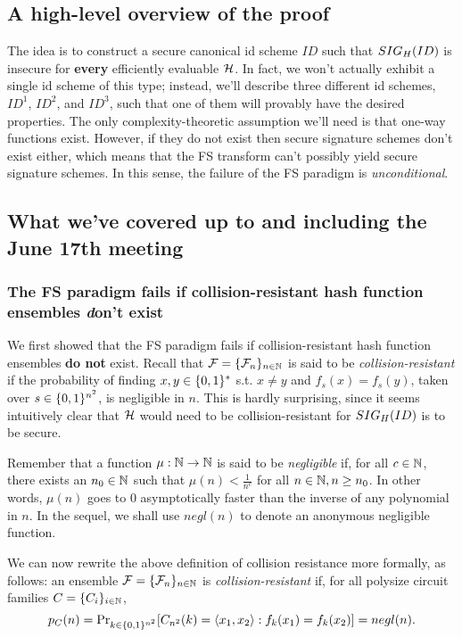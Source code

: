 \documentclass[12pt,twoside]{article}
\begin{document}
\subsection{A high-level overview of the proof}
The idea is to construct a secure canonical id scheme $ID$ such that
$\fs{ID}{H}$ is insecure for {\bf every} efficiently evaluable 
$\fanh$. In fact, we won't actually exhibit a single id scheme of this type; 
instead, we'll describe three different id schemes, $ID^1$, $ID^2$, and 
$ID^3$, such that one of them will provably have the desired properties.
The only complexity-theoretic assumption we'll need is that one-way functions 
exist. However, if they do not exist then secure signature schemes don't exist 
either, which means that the FS transform can't possibly yield secure 
signature schemes. In this sense, the failure of the FS paradigm is 
{\it unconditional}.

\subsection{What we've covered up to and including the June 17th
meeting}
\subsubsection{The FS paradigm fails if collision-resistant hash function 
ensembles {\emph don't} exist}
We first showed that the FS paradigm fails if collision-resistant hash 
function ensembles {\bf do not} exist. Recall that $\fanf = \ens{\fanf}{n}$ is 
said to be {\it collision-resistant} 
if the probability of finding $x,y \in \strs{*}$ s.t. $x \neq y$ and 
$f_s(x) = f_s(y)$, taken over $s \in \strs{n^2}$, is negligible in $n$.
This is hardly surprising, since it seems intuitively clear that $\fanh$ would 
need to be collision-resistant for $\fs{ID}{H}$ is to be secure. 

Remember that a function $\mu : \nats \to \nats$ is said to be {\it negligible}
if, for all $c \in \nats$, there exists an $n_0 \in \nats$ such that $\mu(n) < 
\frac{1}{n^c}$ for all $n \in \nats, n \geq n_0$. In other words, $\mu(n)$ 
goes to 0 asymptotically faster than the inverse of any polynomial in $n$. In
the sequel, we shall use $negl(n)$ to denote an anonymous negligible function.

We can now rewrite the above definition of collision resistance more formally, 
as follows: an ensemble $\fanf = \ens{\fanf}{n}$ is {\it collision-resistant} 
if, for all polysize circuit families $C = \ens{C}{i}$,
\[
p_C(n) = \pr{C_{n^2}(k) = \enc{x_1,x_2} : f_k(x_1) = f_k(x_2)}{k}{\strs{n^2}} =
negl(n).
\]  
\end{document}
